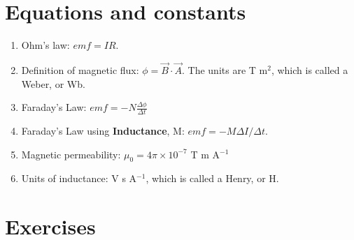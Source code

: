 \documentclass[10pt]{article}
\begin{document}
\maketitle

\section{Equations and constants}

\begin{enumerate}
\item Ohm's law: $emf = IR$.
\item Definition of magnetic flux: $\phi = \vec{B} \cdot \vec{A}$.  The units are T m$^2$, which is called a Weber, or Wb.
\item Faraday's Law: $emf = -N \frac{\Delta \phi}{\Delta t}$
\item Faraday's Law using \textbf{Inductance}, M: $emf = -M \Delta I / \Delta t$.
\item Magnetic permeability: $\mu_0 = 4\pi \times 10^{-7}$ T m A$^{-1}$
\item Units of inductance: V s A$^{-1}$, which is called a Henry, or H.
\end{enumerate}

\section{Exercises}
\end{document}
